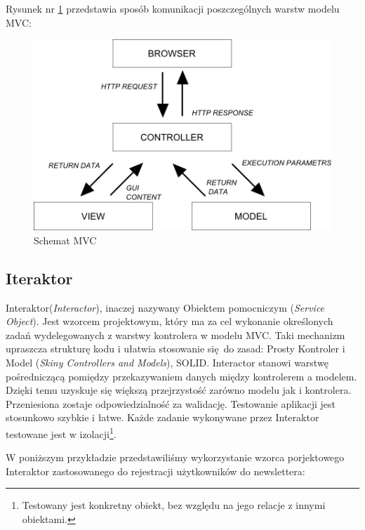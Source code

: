     Rysunek nr \ref{fig:model_mvc} przedstawia sposób komunikacji poszczególnych warstw modelu MVC:
    \begin{figure}[h]
      \centering
      \includegraphics[scale=0.87]{images/mvc_model.png}
      \caption{Schemat MVC}
      \label{fig:model_mvc}
    \end{figure}
  \clearpage
  \subsection{Iteraktor}
  Interaktor\cite{interactors}(\emph{Interactor}), inaczej nazywany Obiektem pomocniczym (\emph{Service Object}).
  Jest wzorcem projektowym, który ma za cel wykonanie określonych zadań wydelegowanych z warstwy kontrolera w modelu MVC. Taki mechanizm upraszcza strukturę kodu i ułatwia stosowanie się do zasad: Prosty Kontroler i Model (\emph{Skiny Controllers and Models}), SOLID.
  Interactor stanowi warstwę pośredniczącą pomiędzy przekazywaniem danych między kontrolerem a modelem.
  Dzięki temu uzyskuje się większą przejrzystość zarówno modelu jak i kontrolera. Przeniesiona zostaje odpowiedzialność za walidację. Testowanie aplikacji jest stosunkowo szybkie i łatwe. Każde zadanie wykonywane przez Interaktor testowane jest w izolacji\footnote{Testowany jest konkretny obiekt, bez względu na jego relacje z innymi obiektami.}.

  W poniższym przykładzie przedstawiliśmy wykorzystanie wzorca porjektowego Interaktor zastosowanego do rejestracji użytkowników do newslettera:\\
  
